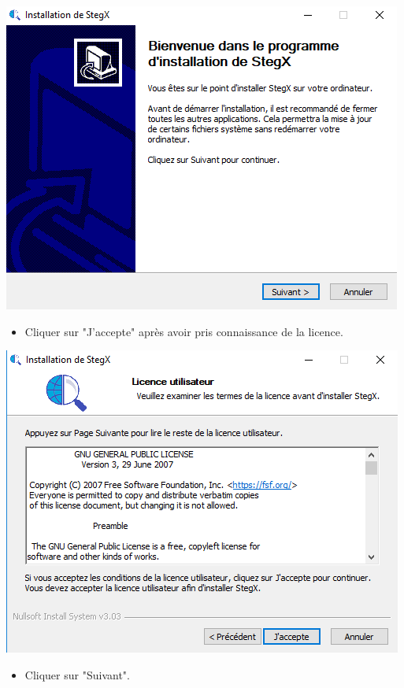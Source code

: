 \documentclass[11pt]{article}
\begin{document}
\hspace{1cm}
\includegraphics[scale=1]{pictures/presentation.png}
\vspace{1cm}
\newpage
\begin{itemize}
\item Cliquer sur "J'accepte" après avoir pris connaissance de la licence. 
\end{itemize}

\hspace{1cm}
\includegraphics[scale=1]{pictures/licence.png}
\vspace{1cm}

\begin{itemize}
\item Cliquer sur "Suivant". 
\end{itemize}
\end{document}
